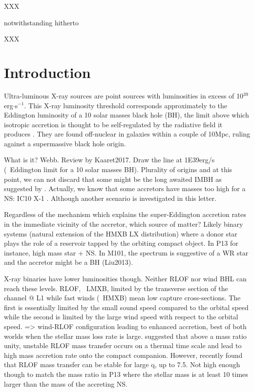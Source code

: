 \documentclass[letter]{aa}
\makeatletter
\newcommand*{\ns}{NS\@\xspace}
\newcommand*{\bh}{BH\@\xspace}
\makeatother
\begin{document}

   \maketitle
%

XXX

notwithstanding
hitherto

XXX

\section{Introduction}

Ultra-luminous X-ray sources are point sources with luminosities in excess of 10$^{39}$erg$\cdot$s$^{-1}$. This X-ray luminosity threshold corresponds approximately to the Eddington luminosity of a 10 solar masses black hole (\bh), the limit above which isotropic accretion is thought to be self-regulated by the radiative field it produces \citep{Rappaport2005}. They are found off-nuclear in galaxies within a couple of 10Mpc, ruling against a supermassive black hole origin.

What is it? Webb. Review by Kaaret2017. Draw the line at 1E39erg/s (~Eddington limit for a 10 solar masses BH). Plurality of origins and at this point, we can not discard that some might be the long awaited IMBH as suggested by \cite{Colbert1999}. Actually, we know that some accretors have masses too high for a \ns : IC10 X-1 \citep{Prestwich2007,Silverman2008}. Although another scenario is investigated in this letter.

Regardless of the mechanism which explains the super-Eddington accretion rates in the immediate vicinity of the accretor, which source of matter? Likely binary systems (natural extension of the HMXB LX distribution) where a donor star plays the role of a reservoir tapped by the orbiting compact object. In P13 for instance, high mass star + NS. In M101, the spectrum is suggestive of a WR star and the accretor might be a BH (Liu2013).

X-ray binaries have lower luminosities though. Neither RLOF nor wind BHL can reach these levels. RLOF, ~LMXB, limited by the transverse section of the channel @ L1 while fast winds (~HMXB) mean low capture cross-sections. The first is essentially limited by the small sound speed compared to the orbital speed while the second is limited by the large wind speed with respect to the orbital speed. => wind-RLOF configuration leading to enhanced accretion, best of both worlds when the stellar mass loss rate is large. \cite{King2002} suggested that above a mass ratio unity, unstable RLOF mass transfer occurs on a thermal time scale and lead to high mass accretion rate onto the compact companion. However, \cite{Pavlovskii2017} recently found that RLOF mass transfer can be stable for large q, up to 7.5. Not high enough though to match the mass ratio in P13 where the stellar mass is at least 10 times larger than the mass of the accreting \ns.
\end{document}
